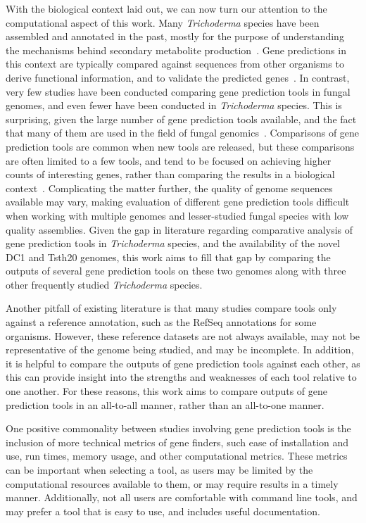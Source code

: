 With the biological context laid out, we can now turn our attention to the computational aspect of this work. Many \textit{Trichoderma} species have been assembled and annotated in the past, mostly for the purpose of understanding the mechanisms behind secondary metabolite production~\cite{Mukherjee2012}. Gene predictions in this context are typically compared against sequences from other organisms to derive functional information, and to validate the predicted genes~\cite{loftus2003a}. In contrast, very few studies have been conducted comparing gene prediction tools in fungal genomes, and even fewer have been conducted in \textit{Trichoderma} species. This is surprising, given the large number of gene prediction tools available, and the fact that many of them are used in the field of fungal genomics~\cite{ejigu2020a}. Comparisons of gene prediction tools are common when new tools are released, but these comparisons are often limited to a few tools, and tend to be focused on achieving higher counts of interesting genes, rather than comparing the results in a biological context~\cite{min2017}. Complicating the matter further, the quality of genome sequences available may vary, making evaluation of different gene prediction tools difficult when working with multiple genomes and lesser-studied fungal species with low quality assemblies. Given the gap in literature regarding comparative analysis of gene prediction tools in \textit{Trichoderma} species, and the availability of the novel DC1 and Tsth20 genomes, this work aims to fill that gap by comparing the outputs of several gene prediction tools on these two genomes along with three other frequently studied \textit{Trichoderma} species. 

Another pitfall of existing literature is that many studies compare tools only against a reference annotation, such as the RefSeq annotations for some organisms. However, these reference datasets are not always available, may not be representative of the genome being studied, and may be incomplete. In addition, it is helpful to compare the outputs of gene prediction tools against each other, as this can provide insight into the strengths and weaknesses of each tool relative to one another. For these reasons, this work aims to compare outputs of gene prediction tools in an all-to-all manner, rather than an all-to-one manner.

One positive commonality between studies involving gene prediction tools is the inclusion of more technical metrics of gene finders, such ease of installation and use, run times, memory usage, and other computational metrics. These metrics can be important when selecting a tool, as users may be limited by the computational resources available to them, or may require results in a timely manner. Additionally, not all users are comfortable with command line tools, and may prefer a tool that is easy to use, and includes useful documentation.  

